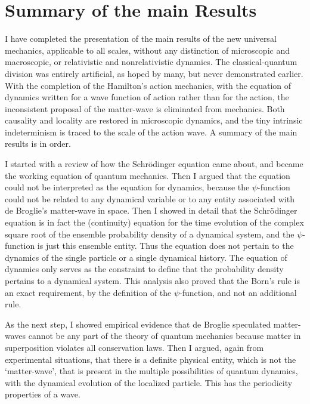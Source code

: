 \section{Summary of the main Results}%


I have completed the presentation of the main results of the new universal mechanics,
applicable to all scales, without any distinction of microscopic and macroscopic, or relativistic and nonrelativistic dynamics. The classical-quantum division was entirely artificial, as hoped by many, but never demonstrated earlier. With the completion of the Hamilton's action mechanics, with the equation of dynamics written for a wave function of action rather than for the action, the inconsistent proposal of the matter-wave is eliminated from mechanics. Both causality and locality are restored in microscopic dynamics, and the tiny intrinsic indeterminism is traced to the scale of the action wave. A summary of the main results is in order.

I started with a review of how the Schr\"{o}dinger equation came about, and became the
working equation of quantum mechanics. Then I argued that the equation could not be
interpreted as the equation for dynamics, because the $\psi$-function could not be related to
any dynamical variable or to any entity associated with de Broglie's matter-wave in space.
Then I showed in detail that the Schr\"{o}dinger equation is in fact the (continuity) equation
for the time evolution of the complex square root of the ensemble probability density of a
dynamical system, and the $\psi$-function is just this ensemble entity. Thus the equation does
not pertain to the dynamics of the single particle or a single dynamical history. The equation
of dynamics only serves as the constraint to define that the probability density pertains to
a dynamical system. This analysis also proved that the Born's rule is an exact requirement,
by the definition of the $\psi$-function, and not an additional rule.

As the next step, I showed empirical evidence that de Broglie speculated matter-waves
cannot be any part of the theory of quantum mechanics because matter in superposition
violates all conservation laws. Then I argued, again from experimental situations, that there
is a definite physical entity, which is not the `matter-wave', that is present in the multiple
possibilities of quantum dynamics, with the dynamical evolution of the localized particle. This has the periodicity properties of a wave.

